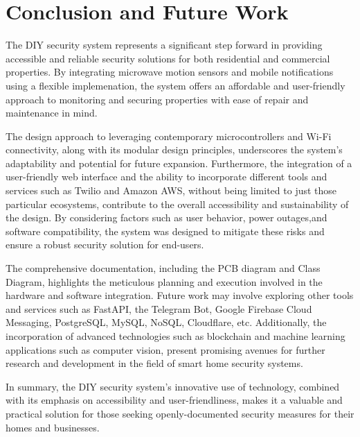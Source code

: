 \section{Conclusion and Future Work}\label{sec:conclusion-and-future-work}

The \brand{} DIY security system represents a significant step forward in providing
accessible and reliable security solutions for both residential and commercial properties.
By integrating microwave motion sensors and mobile notifications using a flexible implemenation,
the system offers an affordable and user-friendly approach to monitoring and securing properties
with ease of repair and maintenance in mind.

The design approach to leveraging contemporary microcontrollers and Wi-Fi connectivity, along
with its modular design principles, underscores the system's adaptability and potential for
future expansion. Furthermore, the integration of a user-friendly web interface and the ability
to incorporate different tools and services such as Twilio and Amazon AWS, without being limited to just those particular ecosystems, contribute to the overall accessibility and sustainability of the design. By considering factors such as user behavior, power outages,and software compatibility, the system was designed to mitigate these risks and ensure a robust security solution for end-users.

The comprehensive documentation, including the PCB diagram and Class Diagram, highlights the
meticulous planning and execution involved in the hardware and software integration. Future work
may involve exploring other tools and services such as FastAPI, the Telegram Bot, Google
Firebase Cloud Messaging, PostgreSQL, MySQL, NoSQL, Cloudflare, etc. Additionally, the
incorporation of advanced technologies such as blockchain and machine learning applications such
as computer vision, present promising avenues for further research and development in the field
of smart home security systems.

In summary, the \brand{} DIY security system's innovative use of technology, combined with
its emphasis on accessibility and user-friendliness, makes it a valuable and practical
solution for those seeking openly-documented security measures for their homes and businesses.
